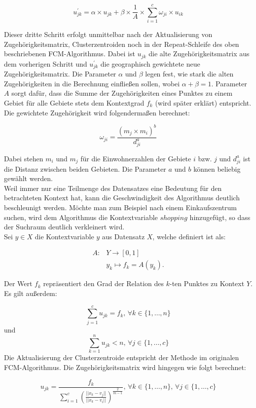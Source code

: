\documentclass[11pt,ceqn]{book}
\begin{document}
$$u_{jk}^{\prime} = \alpha \times u_{jk}+\beta \times \frac{1}{A} \times \sum\limits_{i=1}^c \omega_{ji} \times u _{ik}$$

Dieser dritte Schritt erfolgt unmittelbar nach der Aktualisierung von Zugehörigkeitsmatrix, Clusterzentroiden noch in der Repeat-Schleife des oben beschriebenen FCM-Algorithmus. Dabei ist $u_{jk}$ die alte Zugehörigkeitsmatrix aus dem vorherigen Schritt und $u_{jk}^{\prime}$ die geographisch gewichtete neue Zugehörigkeitsmatrix. Die Parameter $\alpha$ und $\beta$ legen fest, wie stark die alten Zugehörigkeiten in die Berechnung einfließen sollen, wobei $\alpha + \beta = 1$. Parameter $A$ sorgt dafür, dass die Summe der Zugehörigkeiten eines Punktes zu einem Gebiet für alle Gebiete stets dem Kontextgrad $f_k$ (wird später erklärt) entspricht. Die gewichtete Zugehörigkeit wird folgendermaßen berechnet:

$$\omega_{ji} = \frac{\left(m_j \times m_i\right)^b}{d_{ji}^{a}}$$

Dabei stehen $m_i$ und $m_j$ für die Einwohnerzahlen der Gebiete $i$ bzw. $j$ und $d_{ji}^a$ ist die Distanz zwischen beiden Gebieten. Die Parameter $a$ und $b$ können beliebig gewählt werden. 
\\
Weil immer nur eine Teilmenge des Datensatzes eine Bedeutung für den betrachteten Kontext hat, kann die Geschwindigkeit des Algorithmus deutlich beschleunigt werden. Möchte man zum Beispiel nach einem Einkaufszentrum suchen, wird dem Algorithmus die Kontextvariable $shopping$ hinzugefügt, so dass der Suchraum deutlich verkleinert wird.
\\
Sei $y\in X$ die Kontextvariable $y$ aus Datensatz $X$, welche definiert ist als:

\begin{align*}
A \colon &Y \to \left[0,1\right] \\
  &y_k \mapsto f_k = A(y_k).
\end{align*}

Der Wert $f_k$ repräsentiert den Grad der Relation des $k$-ten Punktes zu Kontext $Y$.
\\
Es gilt außerdem:

$$\sum\limits_{j=1}^c u_{jk} = f_k,\, \forall k\in\{1,\dots,n\}$$
und 
$$\sum\limits_{k=1}^n u_{jk} < n, \, \forall j \in \{1,\dots ,c \}$$
Die Aktualisierung der Clusterzentroide entspricht der Methode im originalen FCM-Algorithmus. Die Zugehörigkeitsmatrix wird hingegen wie folgt berechnet:

$$u_{jk}=\frac{f_k}{\sum\limits_{i=1}^c \left(\frac{||x_k-v_j||}{||x_k-v_i||}\right)^{\frac{2}{m-1}}},\, \forall k\in\{1,\dots,n\},\,\forall j\in\{1,\dots,c\}$$
\end{document}
